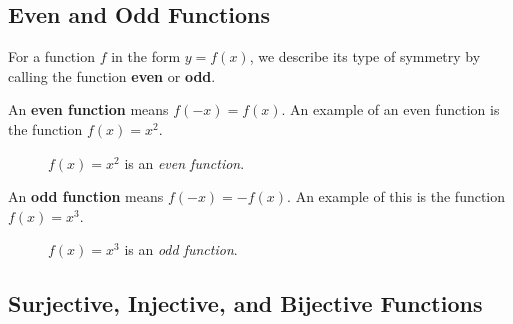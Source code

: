 \subsection{Even and Odd Functions}

For a function $f$ in the form $y=f(x)$, we describe its type of symmetry by 
calling the function \textbf{even} or 
\textbf{odd}.

An \textbf{even function} means $f(-x)=f(x)$.
An example of an even function is the function $f(x)=x^2$.
  \begin{figure}[H]
    \begin{center}
    \end{center}
    \caption{$f(x)=x^2$ is an \emph{even function}.}
  \end{figure}
  An \textbf{odd function} means $f(-x)=-f(x)$. An example of this is the 
  function $f(x)=x^3$.
  \begin{figure}[H]
    \begin{center}
    \end{center}
    \caption{$f(x)=x^3$ is an \emph{odd function}.}
  \end{figure}
\subsection{Surjective, Injective, and Bijective Functions}

